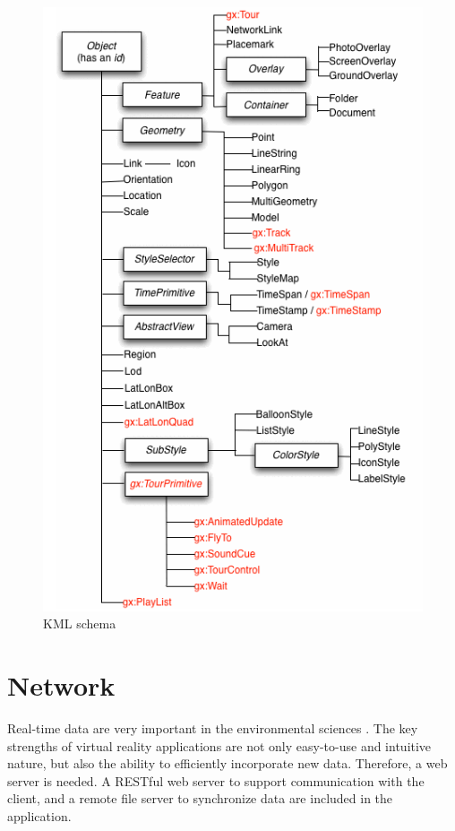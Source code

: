 \begin{figure}[H]
\caption[KML schema]{KML schema \cite{google.kml.2016}}
\label{fig:kml-schema}
\centering
\includegraphics[height=0.7\textheight, keepaspectratio]{Figures/kml-schema.png}
\decoRule
\end{figure}

\section{Network}
\label{section:network}

Real-time data are very important in the environmental sciences \cite{blower.sharing-visualizing.2007}. The key strengths of virtual reality applications are not only easy-to-use and intuitive nature, but also the ability to efficiently incorporate new data. Therefore, a web server is needed. A RESTful web server to support communication with the client, and a remote file server to synchronize data are included in the application.

